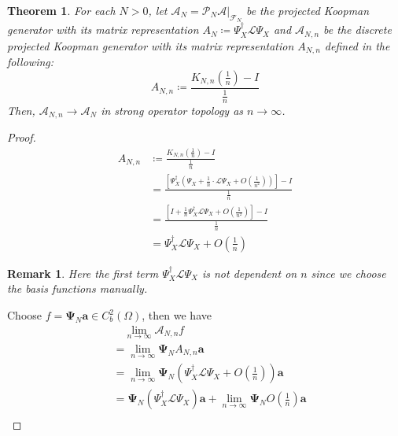 \documentclass{article}[11]
\newtheorem{theorem}{Theorem}
\newtheorem*{remark}{Remark}
\begin{document}
\begin{theorem}
	 For each $N>0$, let $\mathcal{A}_N = \mathcal{P}_N \mathcal{A}|_{\mathcal{F}_N}$ be the projected Koopman generator with its matrix representation $A_N \coloneqq \Psi_X^{\dagger}\mathcal{L}\Psi_X$ and $\mathcal{A}_{N,n}$ be the discrete projected Koopman generator with its matrix representation $A_{N,n}$ defined in the following: 
	 \begin{equation*}
	 	A_{N,n} \coloneqq \frac{ K_{N,n}\left( \tfrac{1}{n} \right)  - I }{\tfrac{1}{n}}
	 \end{equation*}
	 Then, $\mathcal{A}_{N,n} \to \mathcal{A}_N$ in strong operator topology as $n\to\infty$.
\end{theorem}
\begin{proof}
	\begin{align*}
		A_{N,n} &\coloneqq \frac{ K_{N,n}\left( \tfrac{1}{n} \right)  - I }{\tfrac{1}{n}} \\
		&= \frac{ \left[\Psi_X^{\dagger}\left(\Psi_X + \tfrac{1}{n} \cdot \mathcal{L}\Psi_X + O(\tfrac{1}{n^2})\right)\right]  - I }{\tfrac{1}{n}} \\
		&= \frac{ \left[I + \tfrac{1}{n}\Psi_X^{\dagger}\mathcal{L}\Psi_X + O(\tfrac{1}{n^2})\right]  - I }{\tfrac{1}{n}} \\
		&= \Psi_X^{\dagger}\mathcal{L}\Psi_X + O(\tfrac{1}{n})
	\end{align*}
	\begin{remark}
		Here the first term $\Psi_X^{\dagger}\mathcal{L}\Psi_X$ is not dependent on $n$ since we choose the basis functions manually.
	\end{remark}
	Choose $f = \mathbf{\Psi}_N\mathbf{a} \in C_b^2(\Omega)$, then we have
	\begin{align*}
		&\quad \lim_{n\to\infty} \mathcal{A}_{N,n}f \\
		&= \lim_{n\to\infty} \mathbf{\Psi}_N A_{N,n}\mathbf{a} \\
		&= \lim_{n\to\infty} \mathbf{\Psi}_N\left(\Psi_X^{\dagger}\mathcal{L}\Psi_X + O(\tfrac{1}{n})\right)\mathbf{a} \\
		&= \mathbf{\Psi}_N\left(\Psi_X^{\dagger}\mathcal{L}\Psi_X\right)\mathbf{a} + \lim_{n\to\infty} \mathbf{\Psi}_N O(\tfrac{1}{n})\mathbf{a} \\

\end{align*}
\end{proof}
\end{document}

